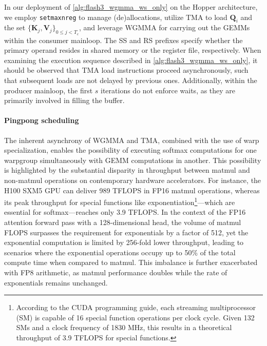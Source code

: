 \begin{enumerate}
In our deployment of \cref{alg:flash3_wgmma_ws_only} on the Hopper architecture, we employ \verb|setmaxnreg| to manage (de)allocations, utilize TMA to load $\mathbf{Q}_i$ and the set $\{ \mathbf{K}_j, \mathbf{V}_j \}_{0 \leq j < T_c}$, and leverage WGMMA for carrying out the GEMMs within the consumer mainloop. The SS and RS prefixes specify whether the primary operand resides in shared memory or the register file, respectively. When examining the execution sequence described in \cref{alg:flash3_wgmma_ws_only}, it should be observed that TMA load instructions proceed asynchronously, such that subsequent loads are not delayed by previous ones. Additionally, within the producer mainloop, the first $s$ iterations do not enforce waits, as they are primarily involved in filling the buffer.

\paragraph{Pingpong scheduling} The inherent asynchrony of WGMMA and TMA, combined with the use of warp specialization, enables the possibility of executing softmax computations for one warpgroup simultaneously with GEMM computations in another. This possibility is highlighted by the substantial disparity in throughput between matmul and non-matmul operations on contemporary hardware accelerators. For instance, the H100 SXM5 GPU can deliver 989 TFLOPS in FP16 matmul operations, whereas its peak throughput for special functions like exponentiation\footnote{According to the CUDA programming guide, each streaming multiprocessor (SM) is capable of 16 special function operations per clock cycle. Given 132 SMs and a clock frequency of 1830 MHz, this results in a theoretical throughput of 3.9 TFLOPS for special functions.}—which are essential for softmax—reaches only 3.9 TFLOPS. In the context of the FP16 attention forward pass with a 128-dimensional head, the volume of matmul FLOPS surpasses the requirement for exponentials by a factor of 512, yet the exponential computation is limited by 256-fold lower throughput, leading to scenarios where the exponential operations occupy up to 50\% of the total compute time when compared to matmul. This imbalance is further exacerbated with FP8 arithmetic, as matmul performance doubles while the rate of exponentials remains unchanged.


\end{enumerate}
